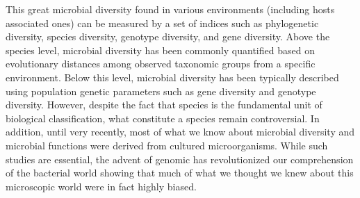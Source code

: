 This great microbial diversity found in various environments (including hosts associated ones) can be measured by a set of indices such as phylogenetic diversity, species diversity, genotype diversity, and gene diversity. Above the species level, microbial diversity has been commonly quantified based on evolutionary distances among observed taxonomic groups from a specific environment. Below this level, microbial diversity has been typically described using population genetic parameters such as gene diversity and genotype diversity. However, despite the fact that species is the fundamental unit of biological classification, what constitute a species remain controversial. In addition, until very recently, most of what we know about microbial diversity and microbial functions were derived from cultured microorganisms. While such studies are essential, the advent of genomic has revolutionized our comprehension of the bacterial world showing that much of what we thought we knew about this microscopic world were in fact highly biased.\\

